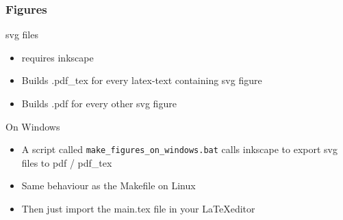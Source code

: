 \documentclass[c,12pt]{beamer}
\begin{document}
\begin{frame}
	\frametitle{Figures}
	\begin{block}{svg files}
		\begin{itemize}
			\item requires inkscape
			\item Builds .pdf\_tex for every latex-text containing svg figure
			\item Builds .pdf for every other svg figure
		\end{itemize}
	\end{block}

	\begin{block}{On Windows}
		\begin{itemize}
			\item A script called \texttt{make\_figures\_on\_windows.bat} calls inkscape to export svg files to pdf / pdf\_tex
			\item Same behaviour as the Makefile on Linux
			\item Then just import the main.tex file in your \LaTeX editor
		\end{itemize}
	\end{block}
\end{frame}
\end{document}
